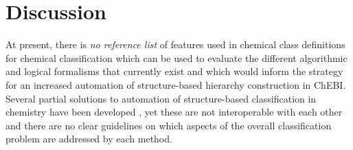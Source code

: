 \documentclass[10pt]{bmc_article}
\newenvironment{bmcformat}{\baselineskip20pt\sloppy\setboolean{publ}{false}}{\baselineskip20pt\sloppy}
\begin{document}
\begin{bmcformat}
\section*{Discussion}



At present, there is \textit{no reference list} of features used in chemical class definitions for chemical classification which can be used to evaluate the different algorithmic and logical formalisms that currently exist and which would inform the strategy for an increased automation of structure-based hierarchy construction in ChEBI. Several partial solutions to automation of structure-based classification in chemistry have been developed %
, yet these are not interoperable with each other and there are no clear guidelines on which aspects of the overall classification problem are addressed by each method. 


\end{bmcformat}
\end{document}
